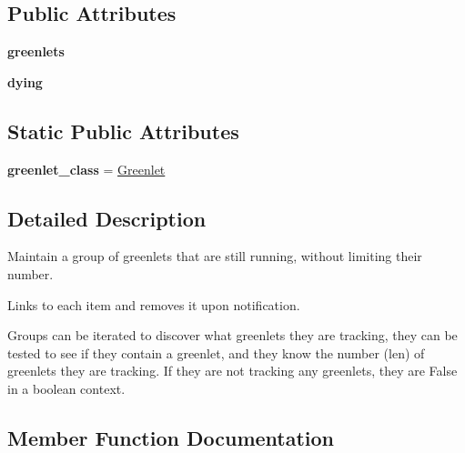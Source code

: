 \subsection*{Public Attributes}
\begin{DoxyCompactItemize}
\item 
\mbox{\label{classgevent_1_1pool_1_1_group_a5a19a7e540744cfa5d99b6346d08f63e}} 
{\bfseries greenlets}
\item 
\mbox{\label{classgevent_1_1pool_1_1_group_a3899c6e8ef072ad586a92da10983429f}} 
{\bfseries dying}
\end{DoxyCompactItemize}
\subsection*{Static Public Attributes}
\begin{DoxyCompactItemize}
\item 
\mbox{\label{classgevent_1_1pool_1_1_group_a194194eca73a1e24f9d8fbc7020d97af}} 
{\bfseries greenlet\+\_\+class} = \hyperlink{classgevent_1_1greenlet_1_1_greenlet}{Greenlet}
\end{DoxyCompactItemize}


\subsection{Detailed Description}
\begin{DoxyVerb}Maintain a group of greenlets that are still running, without
limiting their number.

Links to each item and removes it upon notification.

Groups can be iterated to discover what greenlets they are tracking,
they can be tested to see if they contain a greenlet, and they know the
number (len) of greenlets they are tracking. If they are not tracking any
greenlets, they are False in a boolean context.
\end{DoxyVerb}
 

\subsection{Member Function Documentation}
\mbox{\label{classgevent_1_1pool_1_1_group_ae6fb0617f6960e9d013e20d4a41ee4cf}} 
